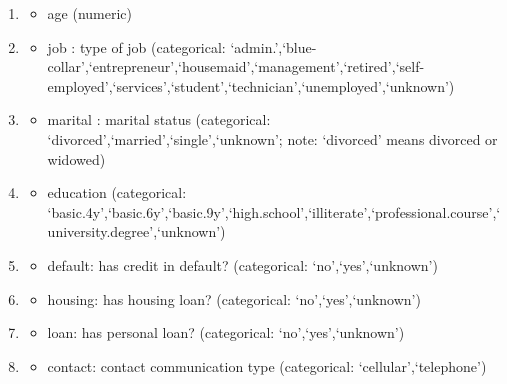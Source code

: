 \documentclass[
  letterpaper,
  DIV=11,
  numbers=noendperiod]{scrartcl}
\providecommand{\tightlist}{%
  \setlength{\itemsep}{0pt}\setlength{\parskip}{0pt}}\usepackage{longtable,booktabs,array}
\begin{document}
\begin{enumerate}
\def\labelenumi{\arabic{enumi}.}
\item
  \begin{itemize}
  \tightlist
  \item
    age (numeric)
  \end{itemize}
\item
  \begin{itemize}
  \tightlist
  \item
    job : type of job (categorical:
    `admin.',`blue-collar',`entrepreneur',`housemaid',`management',`retired',`self-employed',`services',`student',`technician',`unemployed',`unknown')
  \end{itemize}
\item
  \begin{itemize}
  \tightlist
  \item
    marital : marital status (categorical:
    `divorced',`married',`single',`unknown'; note: `divorced' means
    divorced or widowed)
  \end{itemize}
\item
  \begin{itemize}
  \tightlist
  \item
    education (categorical:
    `basic.4y',`basic.6y',`basic.9y',`high.school',`illiterate',`professional.course',`university.degree',`unknown')
  \end{itemize}
\item
  \begin{itemize}
  \tightlist
  \item
    default: has credit in default? (categorical: `no',`yes',`unknown')
  \end{itemize}
\item
  \begin{itemize}
  \tightlist
  \item
    housing: has housing loan? (categorical: `no',`yes',`unknown')
  \end{itemize}
\item
  \begin{itemize}
  \tightlist
  \item
    loan: has personal loan? (categorical: `no',`yes',`unknown')
  \end{itemize}
\item
  \begin{itemize}
  \tightlist
  \item
    contact: contact communication type (categorical:
    `cellular',`telephone')
  \end{itemize}

\end{enumerate}
\end{document}
